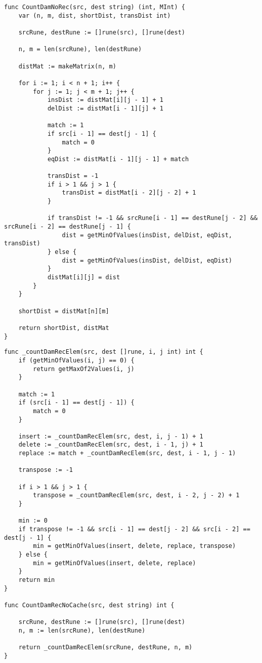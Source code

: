 \begin{lstlisting}[label=leven-recursive,caption=Программный код нахождения расстояния Дамерау -- Левенштейна итеративно]
func CountDamNoRec(src, dest string) (int, MInt) {
	var (n, m, dist, shortDist, transDist int)
	
	srcRune, destRune := []rune(src), []rune(dest)
	
	n, m = len(srcRune), len(destRune)
	
	distMat := makeMatrix(n, m)
	
	for i := 1; i < n + 1; i++ {
		for j := 1; j < m + 1; j++ {
			insDist := distMat[i][j - 1] + 1
			delDist := distMat[i - 1][j] + 1
			
			match := 1
			if src[i - 1] == dest[j - 1] {
				match = 0
			}
			eqDist := distMat[i - 1][j - 1] + match
			
			transDist = -1
			if i > 1 && j > 1 {
				transDist = distMat[i - 2][j - 2] + 1
			}
			
			if transDist != -1 && srcRune[i - 1] == destRune[j - 2] && srcRune[i - 2] == destRune[j - 1] {
				dist = getMinOfValues(insDist, delDist, eqDist, transDist)
			} else {
				dist = getMinOfValues(insDist, delDist, eqDist)
			}
			distMat[i][j] = dist
		}
	}
	
	shortDist = distMat[n][m]
	
	return shortDist, distMat
}
\end{lstlisting}

\begin{lstlisting}[label=damer-lev-iter,caption=Программный код нахождения расстояния Дамерау -- Левенштейна рекурсивно]
func _countDamRecElem(src, dest []rune, i, j int) int {
	if (getMinOfValues(i, j) == 0) {
		return getMaxOf2Values(i, j)
	}
	
	match := 1
	if (src[i - 1] == dest[j - 1]) {
		match = 0
	}
	
	insert := _countDamRecElem(src, dest, i, j - 1) + 1
	delete := _countDamRecElem(src, dest, i - 1, j) + 1
	replace := match + _countDamRecElem(src, dest, i - 1, j - 1)
	
	transpose := -1
	
	if i > 1 && j > 1 {
		transpose = _countDamRecElem(src, dest, i - 2, j - 2) + 1
	}
	
	min := 0
	if transpose != -1 && src[i - 1] == dest[j - 2] && src[i - 2] == dest[j - 1] {
		min = getMinOfValues(insert, delete, replace, transpose)
	} else {
		min = getMinOfValues(insert, delete, replace)
	}
	return min
}

func CountDamRecNoCache(src, dest string) int {
	
	srcRune, destRune := []rune(src), []rune(dest)
	n, m := len(srcRune), len(destRune)
	
	return _countDamRecElem(srcRune, destRune, n, m)
}
\end{lstlisting}

